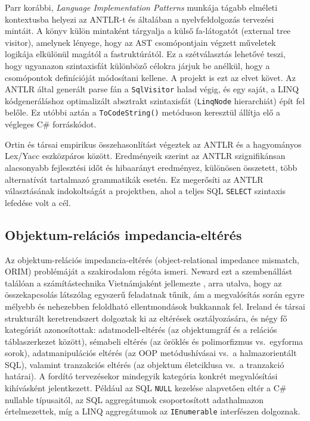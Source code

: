 \documentclass[a4paper,12pt]{article}
\begin{document}
Parr korábbi, \textit{Language Implementation Patterns} \cite{parr2009lip} munkája tágabb elméleti kontextusba helyezi az ANTLR-t és általában a nyelvfeldolgozás tervezési mintáit. A könyv külön mintaként tárgyalja a külső fa-látogatót (external tree visitor), amelynek lényege, hogy az AST csomópontjain végzett műveletek logikája elkülönül magától a fastruktúrától. Ez a szétválasztás lehetővé teszi, hogy ugyanazon szintaxisfát különböző célokra járjuk be anélkül, hogy a csomópontok definícióját módosítani kellene. A projekt is ezt az elvet követ. Az ANTLR által generált parse fán a \texttt{SqlVisitor} halad végig, és egy saját, a LINQ kódgeneráláshoz optimalizált absztrakt szintaxisfát (\texttt{LinqNode} hierarchiát) épít fel belőle. Ez utóbbi aztán a \texttt{ToCodeString()} metóduson keresztül állítja elő a végleges C\# forráskódot.

Ortin és társai \cite{ortin2022antlr} empirikus összehasonlítást végeztek az ANTLR és a hagyományos Lex/Yacc eszközpáros között. Eredményeik szerint az ANTLR szignifikánsan alacsonyabb fejlesztési időt és hibaarányt eredményez, különösen összetett, több alternatívát tartalmazó grammatikák esetén. Ez megerősíti az ANTLR választásának indokoltságát a projektben, ahol a teljes SQL \texttt{SELECT} szintaxis lefedése volt a cél.

\subsection{Objektum-relációs impedancia-eltérés}

Az objektum-relációs impedancia-eltérés (object-relational impedance mismatch, ORIM) problémáját a szakirodalom régóta ismeri. Neward ezt a szembenállást találóan a számítástechnika Vietnámjaként jellemezte \cite{neward2006vietnam}, arra utalva, hogy az összekapcsolás látszólag egyszerű feladatnak tűnik, ám a megvalósítás során egyre mélyebb és nehezebben feloldható ellentmondások bukkannak fel. Ireland és társai \cite{ireland2009orim} strukturált keretrendszert dolgoztak ki az eltérések osztályozására, és négy fő kategóriát azonosítottak: adatmodell-eltérés (az objektumgráf és a relációs táblaszerkezet között), sémabeli eltérés (az öröklés és polimorfizmus vs.\ egyforma sorok), adatmanipulációs eltérés (az OOP metódushívásai vs.\ a halmazorientált SQL), valamint tranzakciós eltérés (az objektum életciklusa vs.\ a tranzakció határai). A fordító tervezésekor mindegyik kategória konkrét megvalósítási kihívásként jelentkezett. Például az SQL \texttt{NULL} kezelése alapvetően eltér a C\# nullable típusaitól, az SQL aggregátumok csoportosított adathalmazon értelmezettek, míg a LINQ aggregátumok az \texttt{IEnumerable} interfészen dolgoznak.
\end{document}
